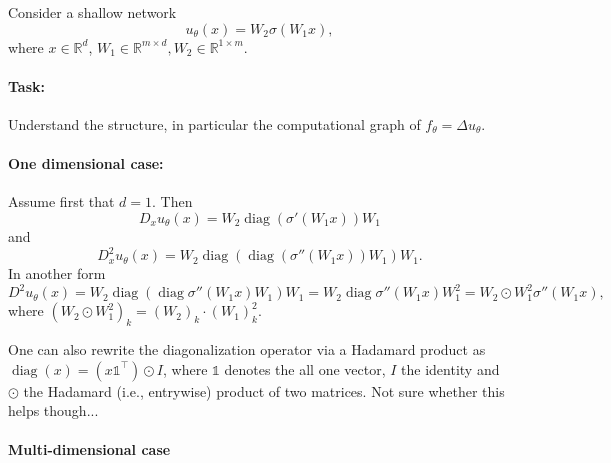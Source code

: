 \documentclass[11pt]{article}
\theoremstyle{definition}
\theoremstyle{plain}
\begin{document}
Consider a shallow network
\[ u_\theta(x) = W_2\sigma(W_1 x), \]
where $x\in\mathbb R^d$, $W_1\in\mathbb R^{m\times d}, W_2\in\mathbb R^{1\times m}$.

\paragraph{Task: }
Understand the structure, in particular the computational graph of $f_\theta = \Delta u_\theta$.

\paragraph{One dimensional case: }
Assume first that $d=1$.
Then
\[ D_x u_\theta(x) = W_2 \operatorname{diag}(\sigma'(W_1 x)) W_1 \]
and
\[ D^2_x u_\theta(x) = W_2%
  \operatorname{diag}(\operatorname{diag}(\sigma''(W_1 x)) W_1)W_1. %
\]
In another form
\[D^2 u_\theta(x) = W_2 \operatorname{diag}(\operatorname{diag}\sigma''(W_1 x) W_1) W_1 = W_2 \operatorname{diag}\sigma''(W_1 x) W_1^2 = W_2\odot W_1^2 \sigma''(W_1x),
\]
where $(W_2\odot W_1^2)_k = (W_2)_k \cdot (W_1)_k^2$.

One can also rewrite the diagonalization operator via a Hadamard product as $\operatorname{diag}(x) = (x\mathds{1}^\top)\odot I$, where $\mathds{1}$ denotes the all one vector, $I$ the identity and $\odot$ the Hadamard (i.e., entrywise) product of two matrices.
Not sure whether this helps though...

\paragraph{Multi-dimensional case}
\end{document}
